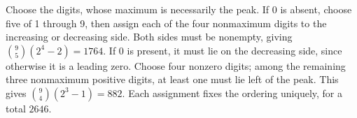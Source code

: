 Choose the digits, whose maximum is necessarily the peak. If 0 is absent, choose five of 1 through 9, then assign each of the four nonmaximum digits to the increasing or decreasing side. Both sides must be nonempty, giving $\binom95(2^4-2)=1764 $. If 0 is present, it must lie on the decreasing side, since otherwise it is a leading zero. Choose four nonzero digits; among the remaining three nonmaximum positive digits, at least one must lie left of the peak. This gives $\binom94(2^3-1)=882 $. Each assignment fixes the ordering uniquely, for a total $\boxed{2646}$.
